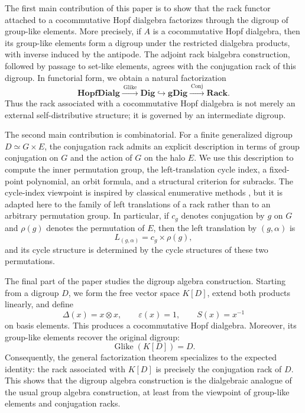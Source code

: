 \documentclass[11pt]{article}
\theoremstyle{plain}
\theoremstyle{definition}
\theoremstyle{remark}
\DeclareMathOperator{\Glike}{Glike}
\DeclareMathOperator{\Conj}{Conj}
\begin{document}
	The first main contribution of this paper is to show that the rack functor
	attached to a cocommutative Hopf dialgebra factorizes through the digroup of
	group-like elements. More precisely, if \(A\) is a cocommutative Hopf
	dialgebra, then its group-like elements form a digroup under the restricted
	dialgebra products, with inverse induced by the antipode. The adjoint rack
	bialgebra construction, followed by passage to set-like elements, agrees with
	the conjugation rack of this digroup. In functorial form, we obtain a natural
	factorization
	\[
	\mathbf{HopfDialg}
	\xrightarrow{\ \Glike\ }
	\mathbf{Dig}
	\hookrightarrow
	\mathbf{gDig}
	\xrightarrow{\ \Conj\ }
	\mathbf{Rack}.
	\]
	Thus the rack associated with a cocommutative Hopf dialgebra is not merely an
	external self-distributive structure; it is governed by an intermediate
	digroup.
	
	The second main contribution is combinatorial. For a finite generalized
	digroup \(D\simeq G\times E\), the conjugation rack admits an explicit
	description in terms of group conjugation on \(G\) and the action of \(G\) on
	the halo \(E\). We use this description to compute the inner permutation group,
	the left-translation cycle index, a fixed-point polynomial, an orbit formula,
	and a structural criterion for subracks. The cycle-index viewpoint is inspired
	by classical enumerative methods \cite{Read1968,HararyPalmer}, but it is
	adapted here to the family of left translations of a rack rather than to an
	arbitrary permutation group. In particular, if \(c_g\) denotes conjugation by
	\(g\) on \(G\) and \(\rho(g)\) denotes the permutation of \(E\), then the left
	translation by \((g,\alpha)\) is
	\[
	L_{(g,\alpha)}=c_g\times \rho(g),
	\]
	and its cycle structure is determined by the cycle structures of these two
	permutations.
	
	The final part of the paper studies the digroup algebra construction. Starting
	from a digroup \(D\), we form the free vector space \(K[D]\), extend both
	products linearly, and define
	\[
	\Delta(x)=x\otimes x,\qquad
	\varepsilon(x)=1,\qquad
	S(x)=x^{-1}
	\]
	on basis elements. This produces a cocommutative Hopf dialgebra. Moreover, its
	group-like elements recover the original digroup:
	\[
	\Glike(K[D])=D.
	\]
	Consequently, the general factorization theorem specializes to the expected
	identity: the rack associated with \(K[D]\) is precisely the conjugation rack of
	\(D\). This shows that the digroup algebra construction is the dialgebraic
	analogue of the usual group algebra construction, at least from the viewpoint
	of group-like elements and conjugation racks.
	
\end{document}
